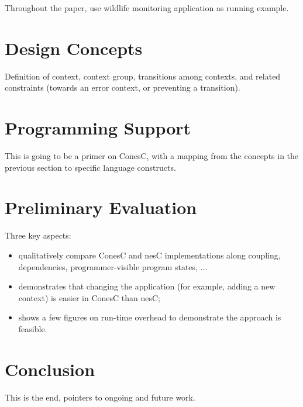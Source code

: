 \documentclass[10pt, conference, compsocconf]{IEEEtran}
\begin{document}
Throughout the paper, use wildlife monitoring application as running
example.

\section{Design Concepts}

Definition of context, context group, transitions among contexts, and
related constraints (towards an error context, or preventing a
transition).

\section{Programming Support}

This is going to be a primer on ConesC, with a mapping from the
concepts in the previous section to specific language constructs.

\section{Preliminary Evaluation}
\noident Three key aspects:
\begin{itemize}
\item qualitatively compare ConesC and nesC implementations along
  coupling, dependencies, programmer-visible program states, ...
\item demonstrates that changing the application (for example, adding
  a new context) is easier in ConesC than nesC;
\item shows a few figures on run-time overhead to demonstrate the
  approach is feasible.
\end{itemize}

\section{Conclusion}

This is the end, pointers to ongoing and future work.


\IEEEpeerreviewmaketitle

\end{document}
